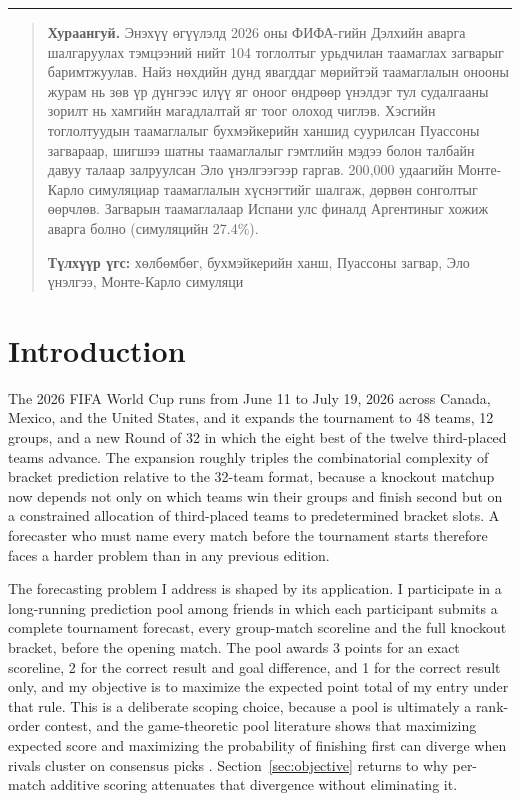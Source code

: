 \documentclass[11pt,a4paper]{article}
\begin{document}
\begin{center}
\rule{0.6\textwidth}{0.4pt}
\end{center}

\begin{quotation}
\small\noindent\textbf{Хураангуй.} Энэхүү өгүүлэлд 2026 оны ФИФА-гийн Дэлхийн аварга шалгаруулах тэмцээний нийт 104 тоглолтыг урьдчилан таамаглах загварыг баримтжуулав. Найз нөхдийн дунд явагддаг мөрийтэй таамаглалын онооны журам нь зөв үр дүнгээс илүү яг оноог өндрөөр үнэлдэг тул судалгааны зорилт нь хамгийн магадлалтай яг тоог олоход чиглэв. Хэсгийн тоглолтуудын таамаглалыг бухмэйкерийн ханшид суурилсан Пуассоны загвараар, шигшээ шатны таамаглалыг гэмтлийн мэдээ болон талбайн давуу талаар залруулсан Эло үнэлгээгээр гаргав. 200{,}000 удаагийн Монте-Карло симуляциар таамаглалын хүснэгтийг шалгаж, дөрвөн сонголтыг өөрчлөв. Загварын таамаглалаар Испани улс финалд Аргентиныг хожиж аварга болно (симуляцийн 27.4\%).

\smallskip
\noindent\textbf{Түлхүүр үгс:} хөлбөмбөг, бухмэйкерийн ханш, Пуассоны загвар, Эло үнэлгээ, Монте-Карло симуляци
\end{quotation}

\section{Introduction}

The 2026 FIFA World Cup runs from June 11 to July 19, 2026 across Canada, Mexico, and the United States, and it expands the tournament to 48 teams, 12 groups, and a new Round of 32 in which the eight best of the twelve third-placed teams advance. The expansion roughly triples the combinatorial complexity of bracket prediction relative to the 32-team format, because a knockout matchup now depends not only on which teams win their groups and finish second but on a constrained allocation of third-placed teams to predetermined bracket slots. A forecaster who must name every match before the tournament starts therefore faces a harder problem than in any previous edition.

The forecasting problem I address is shaped by its application. I participate in a long-running prediction pool among friends in which each participant submits a complete tournament forecast, every group-match scoreline and the full knockout bracket, before the opening match. The pool awards 3 points for an exact scoreline, 2 for the correct result and goal difference, and 1 for the correct result only, and my objective is to maximize the expected point total of my entry under that rule. This is a deliberate scoping choice, because a pool is ultimately a rank-order contest, and the game-theoretic pool literature shows that maximizing expected score and maximizing the probability of finishing first can diverge when rivals cluster on consensus picks \citep{clairletscher2007}. Section~\ref{sec:objective} returns to why per-match additive scoring attenuates that divergence without eliminating it.
\end{document}
